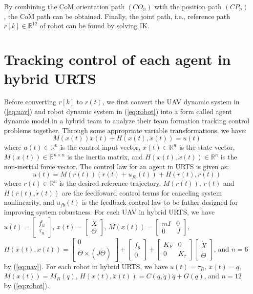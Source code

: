 \documentclass{ieeeaccess}
\begin{document}
By combining the CoM orientation path $(CO_n)$ wtih the position path $(CP_n)$, the CoM path can be obtained. Finally, the joint path, i.e., reference path $r[k]\in\mathbb{R}^{12}$ of robot can be found by solving IK.

\section{Tracking control of each agent in hybrid URTS}
Before converting $r[k]$ to $r(t)$, we first convert the UAV dynamic system in (\ref{eq:uav}) and robot dynamic system in (\ref{eq:robot}) into a form called agent dynamic model in a hybrid team to analyze their team formation tracking control problems together. Through some appropriate variable transformations, we have:
\begin{equation} \label{eq:agent} 
    M(x(t))\ddot{x}(t) + H(x(t),\dot{x}(t)) = u(t)
\end{equation}
where $u(t)\in\mathbb{R}^n$ is the control input vector, $x(t)\in\mathbb{R}^n$ is the state vector, $M(x(t))\in\mathbb{R}^{n\times n}$ is the inertia matrix, and $H(x(t),\dot{x}(t))\in\mathbb{R}^n$ is the non-inertial force vector. The control law for an agent in URTS is given as:
\begin{equation} \label{eq:control}
    u(t)= M(r(t))(\ddot{r}(t) + u_{fb}(t)) + H(r(t),\dot{r}(t)) 
\end{equation}
where $r(t)\in\mathbb{R}^n$ is the desired reference trajectory, $M(r(t))$, $\ddot{r}(t)$ and $H(r(t), \dot{r}(t))$ are the feedfoward control terms for canceling system nonlinearity, and $u_{fb}(t)$ is the feedback control law to be futher designed for improving system robustness. For each UAV in hybrid URTS, we have $u(t)=\begin{bmatrix}
    f_u \\ \tau_u
\end{bmatrix}$, $x(t)=\begin{bmatrix}
    X \\ \Theta
\end{bmatrix}$, $M(x(t))=\begin{bmatrix}
    mI & 0 \\ 0 & J
\end{bmatrix}$, $H(x(t),\dot{x}(t))=\begin{bmatrix}
    0 \\ \dot{\Theta}\times(J\dot{\Theta})
\end{bmatrix}+\begin{bmatrix}
    f_g \\ 0
\end{bmatrix}+\begin{bmatrix}
    K_F & 0 \\
    0 & K_\tau
\end{bmatrix}\begin{bmatrix}
    \dot{X} \\ \dot{\Theta}
\end{bmatrix}$, and $n=6$ by (\ref{eq:uav}). For each robot in hybrid URTS, we have $u(t)=\tau_R$, $x(t)=q$, $M(x(t))=M_R(q)$, $H(x(t),\dot{x}(t))=C(q,\dot{q})\dot{q} + G(q)$, and $n=12$ by (\ref{eq:robot}).
\end{document}
